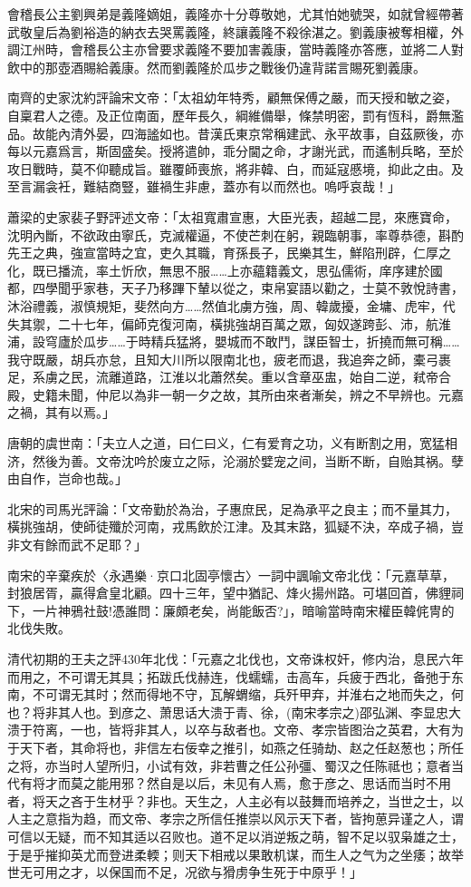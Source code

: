 會稽長公主劉興弟是義隆嫡姐，義隆亦十分尊敬她，尤其怕她號哭，如就曾經帶著武敬皇后為劉裕造的納衣去哭罵義隆，終讓義隆不殺徐湛之。劉義康被奪相權，外調江州時，會稽長公主亦曾要求義隆不要加害義康，當時義隆亦答應，並將二人對飲中的那壺酒賜給義康。然而劉義隆於瓜步之戰後仍違背諾言賜死劉義康。

南齊的史家沈約評論宋文帝：「太祖幼年特秀，顧無保傅之嚴，而天授和敏之姿，自稟君人之德。及正位南面，歷年長久，綱維備舉，條禁明密，罰有恆科，爵無濫品。故能內清外晏，四海謐如也。昔漢氏東京常稱建武、永平故事，自茲厥後，亦每以元嘉爲言，斯固盛矣。授將遣帥，乖分閫之命，才謝光武，而遙制兵略，至於攻日戰時，莫不仰聽成旨。雖覆師喪旅，將非韓、白，而延寇慼境，抑此之由。及至言漏衾衽，難結商豎，雖禍生非慮，蓋亦有以而然也。嗚呼哀哉！」

蕭梁的史家裴子野評述文帝：「太祖寬肅宣惠，大臣光表，超越二昆，來應寶命，沈明內斷，不欲政由寧氏，克滅權逼，不使芒刺在躬，親臨朝事，率尊恭德，斟酌先王之典，強宣當時之宜，吏久其職，育孫長子，民樂其生，鮮陷刑辟，仁厚之化，既已播流，率土忻欣，無思不服……上亦蘊籍義文，思弘儒術，庠序建於國都，四學聞乎家巷，天子乃移蹕下輦以從之，束帛宴語以勸之，士莫不敦悅詩書，沐浴禮義，淑慎規矩，斐然向方……然值北虜方強，周、韓歲擾，金墉、虎牢，代失其禦，二十七年，偏師克復河南，橫挑強胡百萬之眾，匈奴遂跨彭、沛，航淮浦，設穹廬於瓜步……于時精兵猛將，嬰城而不敢鬥，謀臣智士，折撓而無可稱……我守既嚴，胡兵亦怠，且知大川所以限南北也，疲老而退，我追奔之師，橐弓裹足，系虜之民，流離道路，江淮以北蕭然矣。重以含章巫盅，始自二逆，弒帝合殿，史籍未聞，仲尼以為非一朝一夕之故，其所由來者漸矣，辨之不早辨也。元嘉之禍，其有以焉。」

唐朝的虞世南：「夫立人之道，曰仁曰义，仁有爱育之功，义有断割之用，宽猛相济，然後为善。文帝沈吟於废立之际，沦溺於嬖宠之间，当断不断，自贻其祸。孽由自作，岂命也哉。」

北宋的司馬光評論：「文帝勤於為治，子惠庶民，足為承平之良主；而不量其力，橫挑強胡，使師徒殲於河南，戎馬飲於江津。及其末路，狐疑不決，卒成子禍，豈非文有餘而武不足耶？」

南宋的辛棄疾於〈永遇樂·京口北固亭懷古〉一詞中諷喻文帝北伐：「元嘉草草，封狼居胥，贏得倉皇北顧。四十三年，望中猶記、烽火揚州路。可堪回首，佛貍祠下，一片神鴉社鼓!憑誰問：廉頗老矣，尚能飯否?」，暗喻當時南宋權臣韓侂冑的北伐失敗。

清代初期的王夫之評430年北伐：「元嘉之北伐也，文帝诛权奸，修内治，息民六年而用之，不可谓无其具；拓跋氏伐赫连，伐蠕蠕，击高车，兵疲于西北，备弛于东南，不可谓无其时；然而得地不守，瓦解蝟缩，兵歼甲弃，并淮右之地而失之，何也？将非其人也。到彦之、萧思话大溃于青、徐，(南宋孝宗之)邵弘渊、李显忠大溃于符离，一也，皆将非其人，以卒与敌者也。文帝、孝宗皆图治之英君，大有为于天下者，其命将也，非信左右佞幸之推引，如燕之任骑劫、赵之任赵葱也；所任之将，亦当时人望所归，小试有效，非若曹之任公孙彊、蜀汉之任陈祗也；意者当代有将才而莫之能用邪？然自是以后，未见有人焉，愈于彦之、思话而当时不用者，将天之吝于生材乎？非也。天生之，人主必有以鼓舞而培养之，当世之士，以人主之意指为趋，而文帝、孝宗之所信任推崇以风示天下者，皆拘葸异谨之人，谓可信以无疑，而不知其适以召败也。道不足以消逆叛之萌，智不足以驭枭雄之士，于是乎摧抑英尤而登进柔輭；则天下相戒以果敢机谋，而生人之气为之坐痿；故举世无可用之才，以保国而不足，况欲与猾虏争生死于中原乎！」

